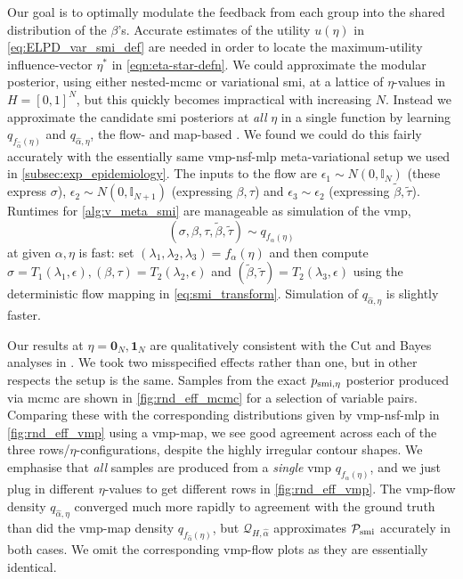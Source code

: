 Our goal is to optimally modulate the feedback from each group into the shared distribution of the $\beta$'s. Accurate estimates of the utility $u(\eta)$ in \cref{eq:ELPD_var_smi_def} are needed in order to locate the maximum-utility influence-vector $\eta^*$ in \cref{eqn:eta-star-defn}. We could
approximate the modular posterior, using either nested-\acrshort*{mcmc} or variational \acrshort*{smi}, at a lattice of $\eta$-values in $H=[0,1]^N$, but this quickly becomes impractical with increasing $N$. Instead we approximate the candidate \acrshort*{smi} posteriors at \emph{all} $\eta$ in a single function by learning $q_{f_{\hat\alpha}(\eta)}$ and $q_{\hat\alpha,\eta}$, the flow- and map-based . We found we could do this fairly accurately with the essentially same \acrshort*{vmp}-\acrshort*{nsf}-\acrshort*{mlp} meta-variational setup we used in \cref{subsec:exp_epidemiology}.
The inputs to the flow are $\epsilon_1\sim N(0,\mathbb{I}_N)$ (these express $\sigma$), $\epsilon_2\sim N(0,\mathbb{I}_{N+1})$ (expressing $\beta, \tau$) and $\epsilon_3\sim \epsilon_2$ (expressing $\tilde\beta, \tilde\tau$). Runtimes for \cref{alg:v_meta_smi} are manageable as simulation of the \acrshort*{vmp},
\begin{equation}\label{eq:hm_sim_vsmi}
  (\sigma,\beta,\tau,\tilde\beta,\tilde\tau)\sim q_{f_\alpha(\eta)} 
\end{equation}
at given $\alpha,\eta$ is fast: set $(\lambda_1,\lambda_2,\lambda_3)=f_{\alpha}(\eta)$ and then compute $\sigma=T_1(\lambda_1,\epsilon), (\beta,\tau)=T_2(\lambda_2,\epsilon)$ and $(\tilde\beta,\tilde\tau)=T_2(\lambda_3,\epsilon)$ using the deterministic flow mapping in \cref{eq:smi_transform}. Simulation of $q_{\hat\alpha,\eta}$ is slightly faster.

Our results at $\eta=\bm{0}_N,\bm{1}_N$ are qualitatively consistent with the Cut and Bayes analyses in \citet[Sec.~4.4]{Jacob2017together}. We took two misspecified effects rather than one, but in other respects the setup is the same. Samples from the exact $p_{\operatorname{\text{smi}},\eta}$ posterior produced via \acrshort*{mcmc} are shown in \cref{fig:rnd_eff_mcmc} for a selection of variable pairs.
Comparing these with the corresponding distributions given by \acrshort*{vmp}-\acrshort*{nsf}-\acrshort*{mlp} in \cref{fig:rnd_eff_vmp} using a \acrshort*{vmp}-map, we see good agreement across each of the three rows/$\eta$-configurations, despite the highly irregular contour shapes. We emphasise that \emph{all} samples are produced from a \emph{single} \acrshort*{vmp} $q_{f_{\hat\alpha}(\eta)}$, and we just plug in different $\eta$-values to get different rows in \cref{fig:rnd_eff_vmp}. The \acrshort*{vmp}-flow density $q_{\hat\alpha,\eta}$ converged much more rapidly to agreement with the ground truth than did the \acrshort*{vmp}-map density $q_{f_{\hat\alpha}(\eta)}$, but $\mathcal{Q}_{H,\hat\alpha}$ approximates $\mathcal{P}_{\operatorname{\text{smi}}}$ accurately in both cases. We omit the corresponding \acrshort*{vmp}-flow plots as they are essentially identical. 

